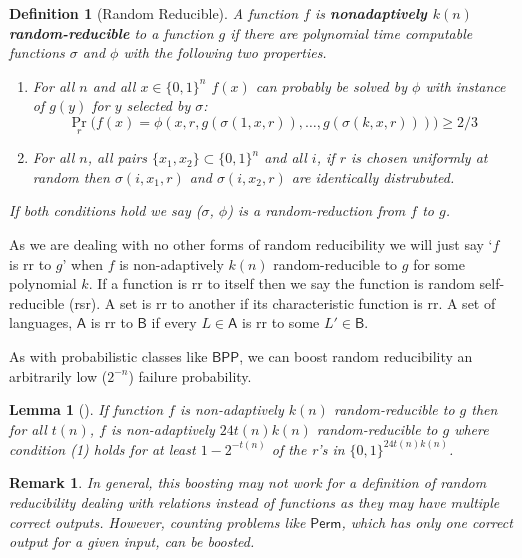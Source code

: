 \documentclass[10pt,a4paper]{article}
\newtheorem{definition}[theorem]{Definition}
\newtheorem{lemma}[theorem]{Lemma}
\newtheorem*{remark*}{Remark}
\begin{document}
\begin{definition}[Random Reducible]\label{def: random reducible}
    A function $f$ is \textbf{nonadaptively $k(n)$ random-reducible} to a function $g$ if there are polynomial time computable functions $\sigma$ and $\phi$ with the following two properties.
    \begin{enumerate}[label={(\arabic*)}]
        \item For all $n$ and all $x \in \{0,1\}^n$ $f(x)$ can probably be solved by $\phi$ with instance of $g(y)$ for $y$ selected by $\sigma$:
            \[
            \Pr_{r}\big(
            f(x)=\phi(x,r,g(\sigma(1,x,r)),\ldots, g(\sigma(k, x, r)))
            \big)\geq2/3
            \]
        \item For all $n$, all pairs $\{x_1,x_2\}\subset \{0,1\}^n$ and all $i$, if $r$ is chosen uniformly at random then $\sigma(i,x_1,r)$ and $\sigma(i,x_2,r)$ are identically distrubuted.
    \end{enumerate}
    If both conditions hold we say ($\sigma$, $\phi$) is a random-reduction from $f$ to $g$.
\end{definition}

As we are dealing with no other forms of random reducibility we will just say `$f$ is rr to $g$' when $f$ is non-adaptively $k(n)$ random-reducible to $g$ for some polynomial $k$. If a function is rr to itself then we say the function is random self-reducible (rsr). A set is rr to another if its characteristic function is rr. A set of languages, $\mathsf{A}$ is rr to $\mathsf{B}$ if every $L\in \mathsf{A}$ is rr to some $L'\in\mathsf{B}$.

As with probabilistic classes like $\mathsf{BPP}$, we can boost random reducibility an arbitrarily low ($2^{-n}$) failure probability.

\begin{lemma}[\cite{feigenbaum1990random}]\label{lma: boost rr}
    If function $f$ is non-adaptively $k(n)$ random-reducible to $g$ then for all $t(n)$, $f$ is non-adaptively $24t(n)k(n)$ random-reducible to $g$ where condition (1) holds for at least $1-2^{-t(n)}$ of the r's in $\{0,1\}^{24t(n)k(n)}$.
\end{lemma}

\begin{remark*}
    In general, this boosting may not work for a definition of random reducibility dealing with relations instead of functions as they may have multiple correct outputs. However, counting problems like $\mathsf{Perm}$, which has only one correct output for a given input, can be boosted.
\end{remark*}
\end{document}
